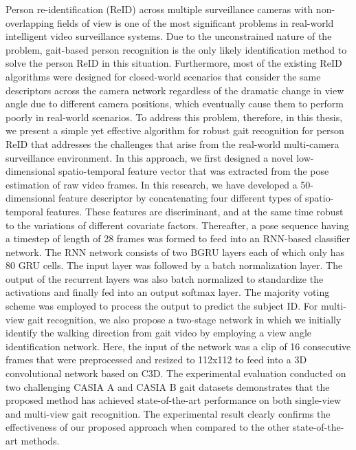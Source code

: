 Person re-identification (ReID) across multiple surveillance cameras with non-overlapping fields of view is one of the most significant problems in real-world intelligent video surveillance systems. Due to the unconstrained nature of the problem, gait-based person recognition is the only likely identification method to solve the person ReID in this situation. Furthermore, most of the existing ReID algorithms were designed for closed-world scenarios that consider the same descriptors across the camera network regardless of the dramatic change in view angle due to different camera positions, which eventually cause them to perform poorly in real-world scenarios. To address this problem, therefore, in this thesis, we present a simple yet effective algorithm for robust gait recognition for person ReID that addresses the challenges that arise from the real-world multi-camera surveillance environment. In this approach, we first designed a novel low-dimensional spatio-temporal feature vector that was extracted from the pose estimation of raw video frames. In this research, we have developed a 50-dimensional feature descriptor by concatenating four different types of spatio-temporal features. These features are discriminant, and at the same time robust to the variations of different covariate factors. Thereafter, a pose sequence having a timestep of length of 28 frames was formed to feed into an RNN-based classifier network. The RNN network consists of two BGRU layers each of which only has 80 GRU cells. The input layer was followed by a batch normalization layer. The output of the recurrent layers was also batch normalized to standardize the activations and finally fed into an output softmax layer. The majority voting scheme was employed to process the output to predict the subject ID. For multi-view gait recognition, we also propose a two-stage network in which we initially identify the walking direction from gait video by employing a view angle identification network. Here, the input of the network was a clip of 16 consecutive frames that were preprocessed and resized to 112x112 to feed into a 3D convolutional network based on C3D. The experimental evaluation conducted on two challenging CASIA A and CASIA B gait datasets demonstrates that the proposed method has achieved state-of-the-art performance on both single-view and multi-view gait recognition. The experimental result clearly confirms the effectiveness of our proposed approach when compared to the other state-of-the-art methods.
\endinput
